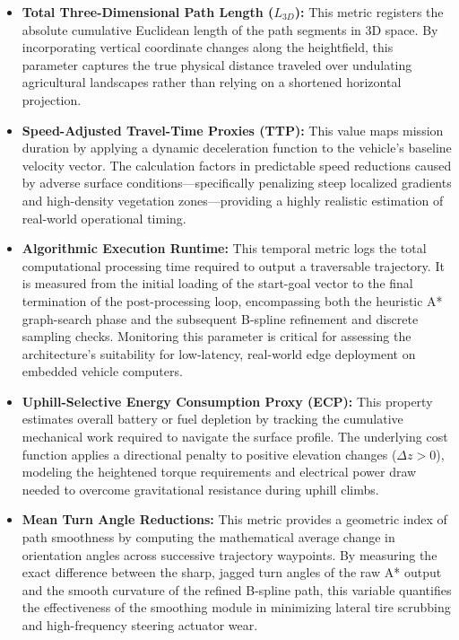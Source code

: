 \begin{itemize}
    \item \textbf{Total Three-Dimensional Path Length ($L_{3D}$):} This metric registers the absolute cumulative Euclidean length of the path segments in 3D space. By incorporating vertical coordinate changes along the heightfield, this parameter captures the true physical distance traveled over undulating agricultural landscapes rather than relying on a shortened horizontal projection.

    \item \textbf{Speed-Adjusted Travel-Time Proxies (TTP):} This value maps mission duration by applying a dynamic deceleration function to the vehicle's baseline velocity vector. The calculation factors in predictable speed reductions caused by adverse surface conditions---specifically penalizing steep localized gradients and high-density vegetation zones---providing a highly realistic estimation of real-world operational timing.

    \item \textbf{Algorithmic Execution Runtime:} This temporal metric logs the total computational processing time required to output a traversable trajectory. It is measured from the initial loading of the start-goal vector to the final termination of the post-processing loop, encompassing both the heuristic A* graph-search phase and the subsequent B-spline refinement and discrete sampling checks. Monitoring this parameter is critical for assessing the architecture's suitability for low-latency, real-world edge deployment on embedded vehicle computers.

    \item \textbf{Uphill-Selective Energy Consumption Proxy (ECP):} This property estimates overall battery or fuel depletion by tracking the cumulative mechanical work required to navigate the surface profile. The underlying cost function applies a directional penalty to positive elevation changes ($\Delta z > 0$), modeling the heightened torque requirements and electrical power draw needed to overcome gravitational resistance during uphill climbs.

    \item \textbf{Mean Turn Angle Reductions:} This metric provides a geometric index of path smoothness by computing the mathematical average change in orientation angles across successive trajectory waypoints. By measuring the exact difference between the sharp, jagged turn angles of the raw A* output and the smooth curvature of the refined B-spline path, this variable quantifies the effectiveness of the smoothing module in minimizing lateral tire scrubbing and high-frequency steering actuator wear.
\end{itemize}

